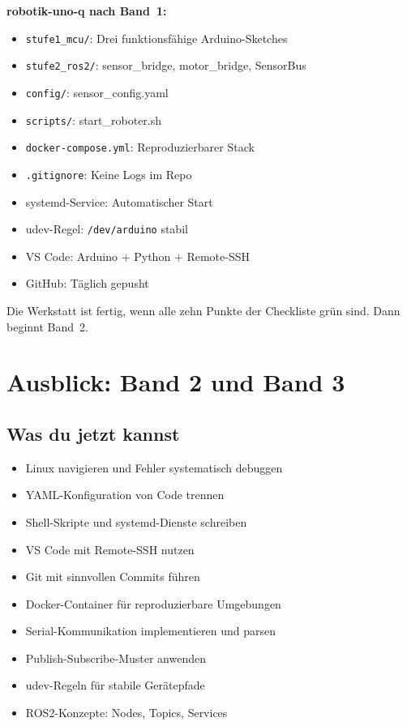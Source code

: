 \begin{projektBox}
\textbf{robotik-uno-q nach Band~1:}
\begin{itemize}
  \item \texttt{stufe1\_mcu/}: Drei funktionsfähige Arduino-Sketches
  \item \texttt{stufe2\_ros2/}: sensor\_bridge, motor\_bridge, SensorBus
  \item \texttt{config/}: sensor\_config.yaml
  \item \texttt{scripts/}: start\_roboter.sh
  \item \texttt{docker-compose.yml}: Reproduzierbarer Stack
  \item \texttt{.gitignore}: Keine Logs im Repo
  \item systemd-Service: Automatischer Start
  \item udev-Regel: \texttt{/dev/arduino} stabil
  \item VS Code: Arduino + Python + Remote-SSH
  \item GitHub: Täglich gepusht
\end{itemize}
\end{projektBox}

\begin{merksatzBox}
Die Werkstatt ist fertig, wenn alle zehn Punkte der
Checkliste grün sind. Dann beginnt Band~2.
\end{merksatzBox}

\chapter{Ausblick: Band 2 und Band 3}


\section{Was du jetzt kannst}

\begin{itemize}
  \item Linux navigieren und Fehler systematisch debuggen
  \item YAML-Konfiguration von Code trennen
  \item Shell-Skripte und systemd-Dienste schreiben
  \item VS Code mit Remote-SSH nutzen
  \item Git mit sinnvollen Commits führen
  \item Docker-Container für reproduzierbare Umgebungen
  \item Serial-Kommunikation implementieren und parsen
  \item Publish-Subscribe-Muster anwenden
  \item udev-Regeln für stabile Gerätepfade
  \item ROS2-Konzepte: Nodes, Topics, Services
\end{itemize}

